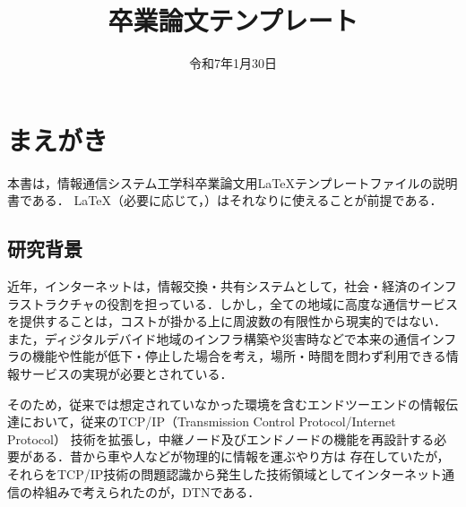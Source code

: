 \documentclass[11pt]{icsthesis}
\title{卒業論文テンプレート}
\date{令和7年1月30日}
\begin{document}
\maketitle
\pagestyle{fancy}
\fancyhead[R]{\nouppercase{\fontsize{10.5pt}{0pt}\selectfont\rightmark}}
\fancyhead[L]{\nouppercase{\fontsize{10.5pt}{0pt}\selectfont\leftmark}}
\fancyfoot[C]{--\ \thepage\ --}
\renewcommand{\headrulewidth}{0.3truemm}
\setcounter{tocdepth}{4}
\pagestyle{fancy}
\fancyfoot[C]{--\ \thepage\ --}
{\makeatletter
\let\ps@jpl@in\ps@empty
\makeatother
\pagestyle{plain}
\tableofcontents
\clearpage}

\chapter{まえがき}
本書は，情報通信システム工学科卒業論文用\LaTeX テンプレートファイルの説明書である．
\LaTeX （必要に応じて，\BibTeX）はそれなりに使えることが前提である．

\section{研究背景}
近年，インターネットは，情報交換・共有システムとして，社会・経済のインフラストラクチャの役割を担っている．しかし，全ての地域に高度な通信サービスを提供することは，コストが掛かる上に周波数の有限性から現実的ではない．
また，ディジタルデバイド地域のインフラ構築や災害時などで本来の通信インフラの機能や性能が低下・停止した場合を考え，場所・時間を問わず利用できる情報サービスの実現が必要とされている．

そのため，従来では想定されていなかった環境を含むエンドツーエンドの情報伝達において，従来のTCP/IP（Transmission Control Protocol/Internet Protocol）
技術を拡張し，中継ノード及びエンドノードの機能を再設計する必要がある．昔から車や人などが物理的に情報を運ぶやり方は
存在していたが，それらをTCP/IP技術の問題認識から発生した技術領域としてインターネット通信の枠組みで考えられたのが，DTNである．
\end{document}
